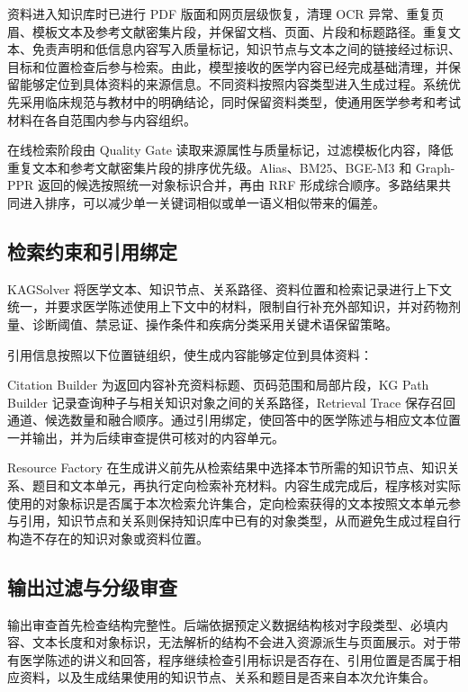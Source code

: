 资料进入知识库时已进行 PDF 版面和网页层级恢复，清理 OCR 异常、重复页眉、模板文本及参考文献密集片段，并保留文档、页面、片段和标题路径。重复文本、免责声明和低信息内容写入质量标记，知识节点与文本之间的链接经过标识、目标和位置检查后参与检索。由此，模型接收的医学内容已经完成基础清理，并保留能够定位到具体资料的来源信息。不同资料按照内容类型进入生成过程。系统优先采用临床规范与教材中的明确结论，同时保留资料类型，使通用医学参考和考试材料在各自范围内参与内容组织。

在线检索阶段由 Quality Gate 读取来源属性与质量标记，过滤模板化内容，降低重复文本和参考文献密集片段的排序优先级。Alias、BM25、BGE-M3 和 Graph-PPR 返回的候选按照统一对象标识合并，再由 RRF 形成综合顺序。多路结果共同进入排序，可以减少单一关键词相似或单一语义相似带来的偏差。

\subsection{检索约束和引用绑定}

KAGSolver 将医学文本、知识节点、关系路径、资料位置和检索记录进行上下文统一，并要求医学陈述使用上下文中的材料，限制自行补充外部知识，并对药物剂量、诊断阈值、禁忌证、操作条件和疾病分类采用关键术语保留策略。

引用信息按照以下位置链组织，使生成内容能够定位到具体资料：

\begin{center}
\end{center}

Citation Builder 为返回内容补充资料标题、页码范围和局部片段，KG Path Builder 记录查询种子与相关知识对象之间的关系路径，Retrieval Trace 保存召回通道、候选数量和融合顺序。通过引用绑定，使回答中的医学陈述与相应文本位置一并输出，并为后续审查提供可核对的内容单元\cite{mirage2024}。

Resource Factory 在生成讲义前先从检索结果中选择本节所需的知识节点、知识关系、题目和文本单元，再执行定向检索补充材料。内容生成完成后，程序核对实际使用的对象标识是否属于本次检索允许集合，定向检索获得的文本按照文本单元参与引用，知识节点和关系则保持知识库中已有的对象类型，从而避免生成过程自行构造不存在的知识对象或资料位置。

\subsection{输出过滤与分级审查}

输出审查首先检查结构完整性。后端依据预定义数据结构核对字段类型、必填内容、文本长度和对象标识，无法解析的结构不会进入资源派生与页面展示。对于带有医学陈述的讲义和回答，程序继续检查引用标识是否存在、引用位置是否属于相应资料，以及生成结果使用的知识节点、关系和题目是否来自本次允许集合。

